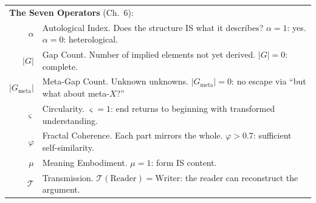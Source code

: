 \documentclass[10pt, openany, oneside]{book}
\renewcommand{\footnotesize}{\fontsize{8.5}{11}\selectfont}
\begin{document}
{\footnotesize
\noindent\begin{tabular}{@{} r @{\hspace{0.6em}} p{} @{}}
\multicolumn{2}{l}{\textbf{The Seven Operators} (Ch.\ 6):} \\[0.3em]
$\alpha$ & Autological Index. Does the structure IS what it describes? $\alpha = 1$: yes. $\alpha = 0$: heterological. \\[0.3em]
$|G|$ & Gap Count. Number of implied elements not yet derived. $|G| = 0$: complete. \\[0.3em]
$|G_{\text{meta}}|$ & Meta-Gap Count. Unknown unknowns. $|G_{\text{meta}}| = 0$: no escape via ``but what about meta-$X$?'' \\[0.3em]
$\varsigma$ & Circularity. $\varsigma = 1$: end returns to beginning with transformed understanding. \\[0.3em]
$\varphi$ & Fractal Coherence. Each part mirrors the whole. $\varphi > 0.7$: sufficient self-similarity. \\[0.3em]
$\mu$ & Meaning Embodiment. $\mu = 1$: form IS content. \\[0.3em]
$\mathcal{T}$ & Transmission. $\mathcal{T}(\text{Reader}) = \text{Writer}$: the reader can reconstruct the argument. \\[0.3em]
\end{tabular}
}

\vspace{0.5em}
\end{document}
